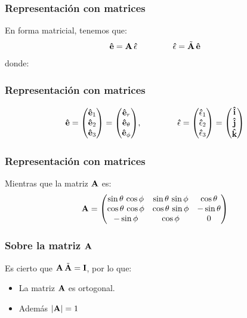 \documentclass[12pt]{beamer}
\begin{document}
\begin{frame}
\frametitle{Representación con matrices}
En forma matricial, tenemos que:
\pause
\begin{align*}
\vu{e} = \vb{A} \, \vu{\epsilon} \hspace{1.5cm} \vu{\epsilon} = \tilde{\vb{A}} \, \vu{e}
\end{align*}
donde:
\end{frame}
\begin{frame}
\frametitle{Representación con matrices}
\begin{align*}
\vu{e} = \mqty(
\vu{e}_{1} \\
\vu{e}_{2} \\
\vu{e}_{3})
= \mqty(
\vu{e}_{r} \\
\vu{e}_{\theta} \\
\vu{e}_{\phi}), \hspace{1.5cm}
\vu{\epsilon} = \mqty(
\vu{\epsilon}_{1} \\
\vu{\epsilon}_{2} \\
\vu{\epsilon}_{3}) = \mqty(
\vu{i} \\
\vu{j} \\
\vu{k})
\end{align*}
\end{frame}
\begin{frame}
\frametitle{Representación con matrices}
Mientras que la matriz $\vb{A}$ es:
\pause
\begin{align*}
\vb{A} = \mqty(
\sin \theta \, \cos \phi & \sin \theta \, \sin \phi & \cos \theta \\
\cos \theta \, \cos \phi & \cos \theta \, \sin \phi & - \sin \theta \\
- \sin \phi & \cos \phi & 0
)
\end{align*}
\end{frame}
\begin{frame}
\frametitle{Sobre la matriz $\vb{A}$}
Es cierto que $\vb{A} \, \tilde{\vb{A}} = \vb{I}$, \pause por lo que:
\pause
\begin{itemize}
\item[\ding{212}] La matriz $\vb{A}$ es ortogonal.
\item[\ding{212}] Además $\abs{\vb{A}} = 1$  
\end{itemize}
\end{frame}

\end{document}
